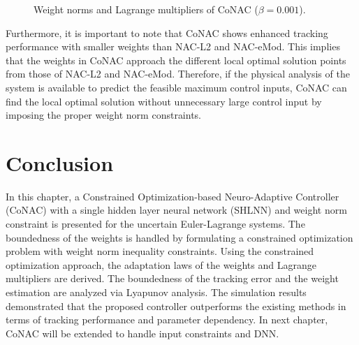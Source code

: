 \begin{figure}[!t]      
    \centering
    \vfill
    \caption{Weight norms and Lagrange multipliers of CoNAC ($\beta=0.001$).}
    \label{chap3:fig:weight_multiplier CoNAC}
\end{figure}

Furthermore, it is important to note that CoNAC shows enhanced tracking performance with smaller weights than NAC-L2 and NAC-eMod.
This implies that the weights in CoNAC approach the different local optimal solution points from those of NAC-L2 and NAC-eMod.
Therefore, if the physical analysis of the system is available to predict the feasible maximum control inputs, CoNAC can find the local optimal solution without unnecessary large control input by imposing the proper weight norm constraints.

\section{Conclusion}

In this chapter, a Constrained Optimization-based Neuro-Adaptive Controller \allowbreak (CoNAC) with a single hidden layer neural network (SHLNN) and weight norm constraint is presented for the uncertain Euler-Lagrange systems.
The boundedness of the weights is handled by formulating a constrained optimization problem with weight norm inequality constraints.
Using the constrained optimization approach, the adaptation laws of the weights and Lagrange multipliers are derived.
The boundedness of the tracking error and the weight estimation are analyzed via Lyapunov analysis.
The simulation results demonstrated that the proposed controller outperforms the existing methods in terms of tracking performance and parameter dependency.
In next chapter, CoNAC will be extended to handle input constraints and DNN.

